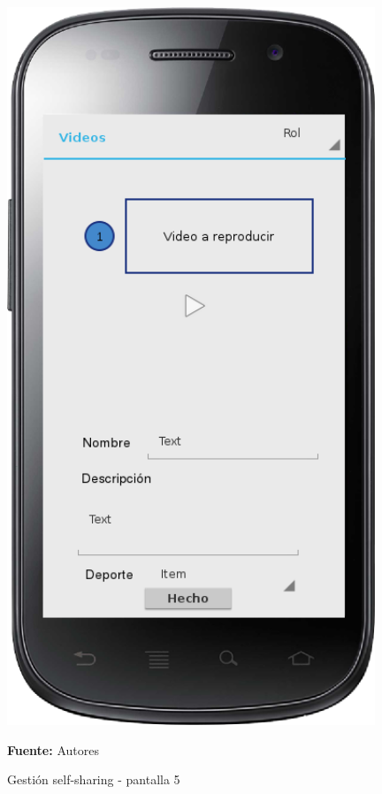 \begin{figure}[!htb]
  \begin{center}
    \includegraphics[width=11cm]{./imagenes/UI/Self_sharing/self_sharing_5.png}
    \caption{Gestión self-sharing - pantalla 5}
    \label{fig:self_sharing_5}
    \textbf{Fuente:}  Autores
  \end{center}
\end{figure}

